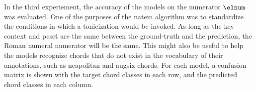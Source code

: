 
In the third experiement, the accuracy of the models on the
numerator $\elnum$ was evaluated. One of the purposes of the
\gls{natem} algorithm was to standardize the conditions in
which a tonicization would be invoked. As long as the key
context and \gls{pcset} are the same between the
ground-truth and the prediction, the Roman numeral numerator
will be the same. This might also be useful to help the
models recognize chords that do not exist in the vocabulary
of their annotations, such as \gls{neapolitan} and
\gls{augsix} chords. For each model, a confusion matrix is
shown with the target chord classes in each row, and the
predicted chord classes in each column.
